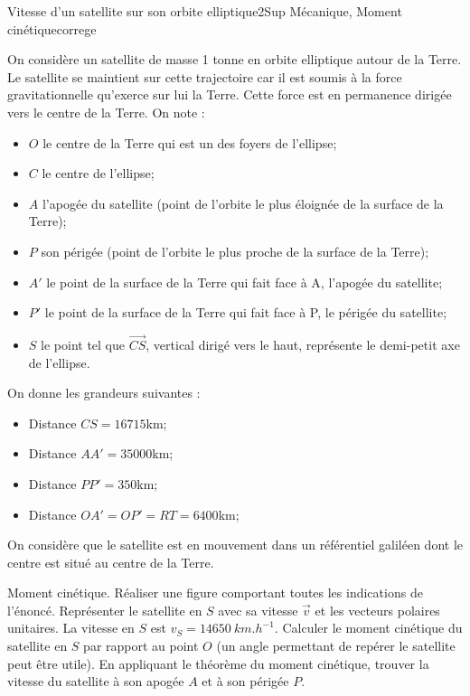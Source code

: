 \begin{exercise}{Vitesse d'un satellite sur son orbite elliptique}{2}{Sup}
{Mécanique, Moment cinétique}{correge}

On considère un satellite de masse 1 tonne en orbite elliptique autour de la Terre. Le satellite se maintient sur cette trajectoire car il est soumis à la force gravitationnelle qu’exerce sur lui la Terre. Cette force est en permanence dirigée vers le centre de la Terre. On note :
\begin{itemize}
    \item $O$ le centre de la Terre qui est un des foyers de l’ellipse;
    \item $C$ le centre de l’ellipse;
    \item $A$ l’apogée du satellite (point de l’orbite le plus éloignée de la surface de la Terre);
    \item $P$ son périgée (point de l’orbite le plus proche de la surface de la Terre);
    \item $A'$ le point de la surface de la Terre qui fait face à A, l’apogée du satellite;
    \item $P'$ le point de la surface de la Terre qui fait face à P, le périgée du satellite;
    \item $S$ le point tel que $\vec{CS}$, vertical dirigé vers le haut, représente le demi-petit axe de l’ellipse.
\end{itemize}
On donne les grandeurs suivantes :
\begin{itemize}
    \item Distance $CS=16715$km;
    \item Distance $AA'=35000$km;
    \item Distance $PP'=350$km;
    \item Distance $OA'=OP'=RT=6400$km;
\end{itemize}
On considère que le satellite est en mouvement dans un référentiel galiléen dont le centre est situé au centre de la Terre.

\begin{questions}
    \questioncours Moment cinétique.
    \question Réaliser une figure comportant toutes les indications de l’énoncé. Représenter le satellite en $S$ avec sa vitesse $\vec v$ et les vecteurs polaires unitaires.
    \question La vitesse en $S$ est $v_S=\SI{14650}{km.h^{-1}}$. Calculer le moment cinétique du satellite en $S $ par rapport au point $O$ (un angle permettant de repérer le satellite peut être utile).
    \question En appliquant le théorème du moment cinétique, trouver la vitesse du satellite à son apogée $A$ et à son périgée $P$.
\end{questions}

\end{exercise}

